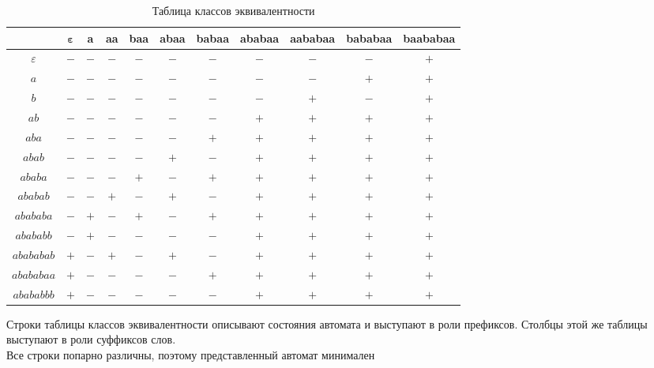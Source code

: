 \documentclass[12pt,a4paper]{article}
\begin{document}
\begin{table}[ht]
\vspace{-5pt}
\centering
\caption{Таблица классов эквивалентности}
\renewcommand{\arraystretch}{1.15}
\begin{tabular}{|c|c|c|c|c|c|c|c|c|c|c|}
\hline
\textbf{ } & $\boldsymbol{\varepsilon}$ & \textbf{a} & \textbf{aa} & \textbf{baa} & \textbf{abaa} & \textbf{babaa} & \textbf{ababaa} & \textbf{aababaa} & \textbf{bababaa} & \textbf{baababaa} \\
\hline
$\varepsilon$ & $-$ & $-$ & $-$ & $-$ & $-$ & $-$ & $-$ & $-$ & $-$ & $+$ \\ \hline
$a$           & $-$ & $-$ & $-$ & $-$ & $-$ & $-$ & $-$ & $-$ & $+$ & $+$ \\ \hline
$b$           & $-$ & $-$ & $-$ & $-$ & $-$ & $-$ & $-$ & $+$ & $-$ & $+$ \\ \hline
$ab$          & $-$ & $-$ & $-$ & $-$ & $-$ & $-$ & $+$ & $+$ & $+$ & $+$ \\ \hline
$aba$         & $-$ & $-$ & $-$ & $-$ & $-$ & $+$ & $+$ & $+$ & $+$ & $+$ \\ \hline
$abab$        & $-$ & $-$ & $-$ & $-$ & $+$ & $-$ & $+$ & $+$ & $+$ & $+$ \\ \hline
$ababa$       & $-$ & $-$ & $-$ & $+$ & $-$ & $+$ & $+$ & $+$ & $+$ & $+$ \\ \hline
$ababab$      & $-$ & $-$ & $+$ & $-$ & $+$ & $-$ & $+$ & $+$ & $+$ & $+$ \\ \hline
$abababa$     & $-$ & $+$ & $-$ & $+$ & $-$ & $+$ & $+$ & $+$ & $+$ & $+$ \\ \hline
$abababb$     & $-$ & $+$ & $-$ & $-$ & $-$ & $-$ & $+$ & $+$ & $+$ & $+$ \\ \hline
$abababab$    & $+$ & $-$ & $+$ & $-$ & $+$ & $-$ & $+$ & $+$ & $+$ & $+$ \\ \hline
$abababaa$    & $+$ & $-$ & $-$ & $-$ & $-$ & $+$ & $+$ & $+$ & $+$ & $+$ \\ \hline
$abababbb$    & $+$ & $-$ & $-$ & $-$ & $-$ & $-$ & $+$ & $+$ & $+$ & $+$ \\ \hline
\end{tabular}
\end{table}

Строки таблицы классов эквивалентности описывают состояния автомата и выступают в роли префиксов. Столбцы этой же таблицы выступают в роли суффиксов слов.\\
Все строки попарно различны, поэтому представленный автомат минимален


\newpage
\end{document}
